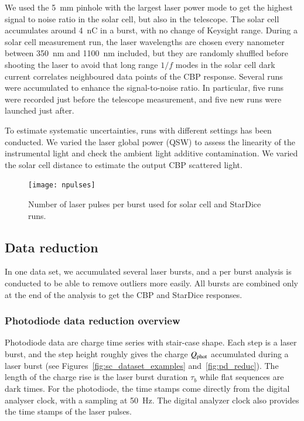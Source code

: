 We used the \SI{5}{\mm} pinhole with the largest laser power mode to get the highest signal to noise ratio in the solar cell, but also in the \SD telescope. The solar cell accumulates around \SI{4}{\nano\coulomb} in a burst, with no change of Keysight range. %
During a solar cell measurement run, the laser wavelengths are chosen every nanometer between \SI{350}{\nano\meter} and \SI{1100}{\nano\meter} included, but they are randomly shuffled before shooting the laser to avoid that long range $1/f$ modes in the solar cell dark current correlates neighboured data points of the CBP response. Several runs were accumulated to enhance the signal-to-noise ratio. In particular, five runs were recorded just before the \SD telescope measurement, and five new runs were launched just after.

To estimate systematic uncertainties, runs with different settings has been conducted. We varied the laser global power (QSW) to assess the linearity of the instrumental light and check the ambient light additive contamination. We varied the solar cell distance to estimate the output CBP scattered light.

\begin{figure}[!h]
\centering
\texttt{[image: npulses]}
\caption{Number of laser pulses per burst used for solar cell and StarDice runs.}\label{fig:npulses}
\end{figure}


\subsection{Data reduction}


In one data set, we accumulated several laser bursts, and a per burst analysis is conducted to be able to remove outliers more easily. All bursts are combined only at the end of the analysis to get the CBP and StarDice responses.

\subsubsection{Photodiode data reduction overview}
\label{sec:pd_reduction}

Photodiode data are charge time series with stair-case shape. Each step is a laser burst, and the step height roughly gives the charge $Q_{\mathrm{phot}}$ accumulated during a laser burst (see Figures~\ref{fig:sc_dataset_examples} and~\ref{fig:pd_reduc}). The length of the charge rise is the laser burst duration $\tau_b$ while flat sequences are dark times. For the photodiode, the time stamps come directly from the digital analyser clock, with a sampling at \SI{50}{\hertz}. The digital analyzer clock also provides the time stamps of the laser pulses. 

